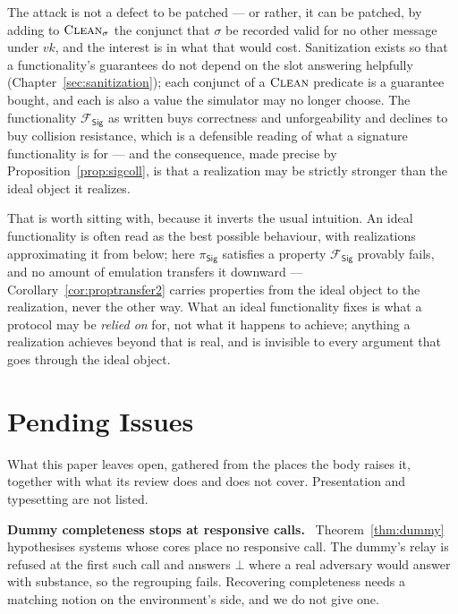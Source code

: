 \documentclass[10pt,oneside,openany]{book}
\makeatletter
\newcommand{\nav@headtext}{}
\newcommand{\chapterheadstar}[1]{\gdef\nav@headtext{#1}}
\newcommand{\op}[1]{\textnormal{\textsc{#1}}}
\newcommand{\Fsig}{\mathcal{F}_{\mathsf{Sig}}}
\newcommand{\psig}{\pi_{\mathsf{Sig}}}
\newcommand{\vk}{\mathit{vk}}
\newcommand{\none}{\bot}
\newcommand{\Clean}{\op{Clean}}
\newcommand{\heading}[1]{\medskip\par\noindent\textcolor{accent}{\textbf{#1.}}\ }
\theoremstyle{accentdef}
\theoremstyle{accentplain}
\makeatother
\begin{document}
The attack is not a defect to be patched --- or rather, it can be patched, by adding to
$\Clean_{\sigma}$ the conjunct that $\sigma$ be recorded valid for no other message under $\vk$,
and the interest is in what that would cost. Sanitization exists so that a functionality's
guarantees do not depend on the slot answering helpfully (Chapter~\ref{sec:sanitization}); each
conjunct of a $\Clean$ predicate is a guarantee bought, and each is also a value the simulator may
no longer choose. The functionality $\Fsig$ as written buys correctness and unforgeability and declines to buy
collision resistance, which is a defensible reading of what a signature functionality is for --- and
the consequence, made precise by Proposition~\ref{prop:sigcoll}, is that a realization may be
strictly stronger than the ideal object it realizes.

That is worth sitting with, because it inverts the usual intuition. An ideal functionality is
often read as the best possible behaviour, with realizations approximating it from below; here
$\psig$ satisfies a property $\Fsig$ provably fails, and no amount of emulation transfers it
downward --- Corollary~\ref{cor:proptransfer2} carries properties from the ideal object to the
realization, never the other way. What an ideal functionality fixes is what a protocol may be
\emph{relied on} for, not what it happens to achieve; anything a realization achieves beyond that
is real, and is invisible to every argument that goes through the ideal object.


{}
\chapter*{Pending Issues}
\chapterheadstar{Pending Issues}

What this paper leaves open, gathered from the places the body raises it, together with what its
review does and does not cover. Presentation and typesetting are not listed.

\heading{Dummy completeness stops at responsive calls} Theorem~\ref{thm:dummy} hypothesises systems
whose cores place no responsive call. The dummy's relay is refused at the first such call and
answers $\none$ where a real adversary would answer with substance, so the regrouping fails.
Recovering completeness needs a matching notion on the environment's side, and we do not give one.
\end{document}
